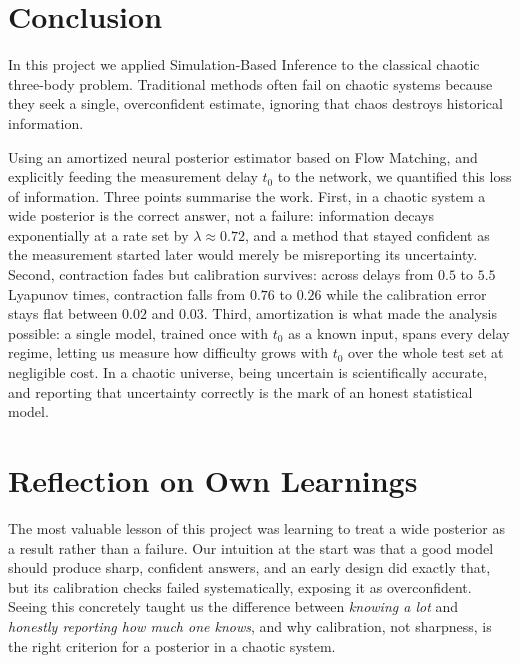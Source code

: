 \documentclass[12pt]{article}
\begin{document}
\section{Conclusion}
In this project we applied Simulation-Based Inference to the classical chaotic three-body problem.
Traditional methods often fail on chaotic systems because they seek a single, overconfident estimate,
ignoring that chaos destroys historical information.
 
Using an amortized neural posterior estimator based on Flow Matching, and explicitly feeding the
measurement delay $t_0$ to the network, we quantified this loss of information. Three points summarise
the work. First, in a chaotic system a wide posterior is the correct answer, not a failure: information
decays exponentially at a rate set by $\lambda \approx 0.72$, and a method that stayed confident as the
measurement started later would merely be misreporting its uncertainty. Second, contraction fades but
calibration survives: across delays from $0.5$ to $5.5$ Lyapunov times, contraction falls from $0.76$ to
$0.26$ while the calibration error stays flat between $0.02$ and $0.03$. Third, amortization is what made
the analysis possible: a single model, trained once with $t_0$ as a known input, spans every delay
regime, letting us measure how difficulty grows with $t_0$ over the whole test set at negligible cost.
In a chaotic universe, being uncertain is scientifically accurate, and reporting that uncertainty
correctly is the mark of an honest statistical model.
 
\section{Reflection on Own Learnings}
The most valuable lesson of this project was learning to treat a wide posterior as a result rather than
a failure. Our intuition at the start was that a good model should produce sharp, confident answers, and
an early design did exactly that, but its calibration checks failed systematically, exposing it as
overconfident. Seeing this concretely taught us the difference between \emph{knowing a lot} and
\emph{honestly reporting how much one knows}, and why calibration, not sharpness, is the right criterion
for a posterior in a chaotic system.
 
\end{document}
